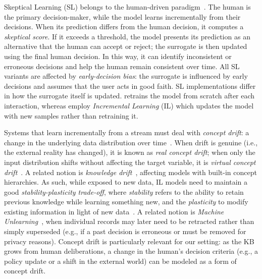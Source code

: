 \documentclass[a4paper,twoside]{article}
\begin{document}
Skeptical Learning (SL) belongs to the human-driven paradigm~\cite{zhang2019personal,zeni2019fixing,bontempelli2020learning,teso2021interactive,Mazzoni2024frank}. The human is the primary decision-maker, while the model learns incrementally from their decisions.
When its prediction differs from the human decision, it computes a \textit{skeptical score}.
If it exceeds a threshold, the model presents its prediction as an alternative that the human can accept or reject; the surrogate is then updated using the final human decision. In this way, it can identify inconsistent or erroneous decisions and help the human remain consistent over time. All SL variants are affected by \textit{early-decision bias}: the surrogate is influenced by early decisions and assumes that the user acts in good faith. SL implementations differ in how the surrogate itself is updated. \cite{zeni2019fixing} retrains the model from scratch after each interaction, whereas \cite{bontempelli2020learning,Mazzoni2024frank} employ \textit{Incremental Learning} (IL) \cite{wang2023comprehensive} which updates the model with new samples rather than retraining it. %

Systems that learn incrementally from a stream must deal with \textit{concept drift}: a change in the underlying data distribution over time~\cite{lu2018learning,li2020incremental}. When drift is genuine (i.e., the external reality has changed), it is known as \textit{real concept drift}; when only the input distribution shifts without affecting the target variable, it is \textit{virtual concept drift}~\cite{gama2014survey}. A related notion is \textit{knowledge drift}~\cite{bontempelli2022human}, affecting models with built-in concept hierarchies. As such, while exposed to new data, IL models need to maintain a good \textit{stability-plasticity trade-off}, where \textit{stability} refers to the ability to retain previous knowledge while learning something new, and the \textit{plasticity} to modify existing information in light of new data~\cite{kim2023stability,liang2023adaptive}. A related notion is \textit{Machine Unlearning}~\cite{nguyen2022survey,qu2023learn}, when individual records may later need to be retracted rather than simply superseded (e.g., if a past decision is erroneous or must be removed for privacy reasons). Concept drift is particularly relevant for our setting: as the KB grows from human deliberations, a change in the human's decision criteria (e.g., a policy update or a shift in the external world) can be modeled as a form of concept drift. 
\end{document}
